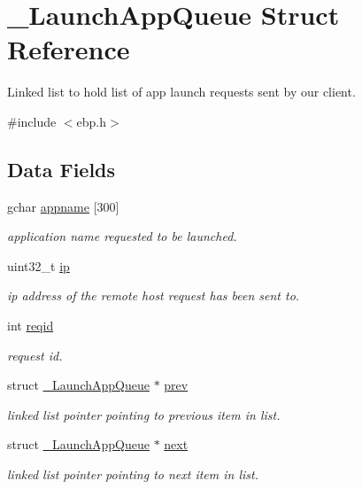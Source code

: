 \hypertarget{struct___launch_app_queue}{\section{\-\_\-\-Launch\-App\-Queue \-Struct \-Reference}
\label{struct___launch_app_queue}
}


\-Linked list to hold list of app launch requests sent by our client.  




{\ttfamily \#include $<$ebp.\-h$>$}

\subsection*{\-Data \-Fields}
\begin{DoxyCompactItemize}
\item 
gchar \hyperlink{struct___launch_app_queue_af8cf62147ff95b08bd4b2d5200c73640}{appname} \mbox{[}300\mbox{]}
\begin{DoxyCompactList}\small\item\em application name requested to be launched. \end{DoxyCompactList}\item 
uint32\-\_\-t \hyperlink{struct___launch_app_queue_a69ddb9c845da426f636d9dd0dbed4e7e}{ip}
\begin{DoxyCompactList}\small\item\em ip address of the remote host request has been sent to. \end{DoxyCompactList}\item 
int \hyperlink{struct___launch_app_queue_a2358dbe4119c1a52c0dc643be9977af9}{reqid}
\begin{DoxyCompactList}\small\item\em request id. \end{DoxyCompactList}\item 
struct \hyperlink{struct___launch_app_queue}{\-\_\-\-Launch\-App\-Queue} $\ast$ \hyperlink{struct___launch_app_queue_a6f9df1a0cb11dcb6a5938b0d7f80a124}{prev}
\begin{DoxyCompactList}\small\item\em linked list pointer pointing to previous item in list. \end{DoxyCompactList}\item 
struct \hyperlink{struct___launch_app_queue}{\-\_\-\-Launch\-App\-Queue} $\ast$ \hyperlink{struct___launch_app_queue_a35e0e803873d619d27995e4ddae06229}{next}
\begin{DoxyCompactList}\small\item\em linked list pointer pointing to next item in list. \end{DoxyCompactList}\end{DoxyCompactItemize}


